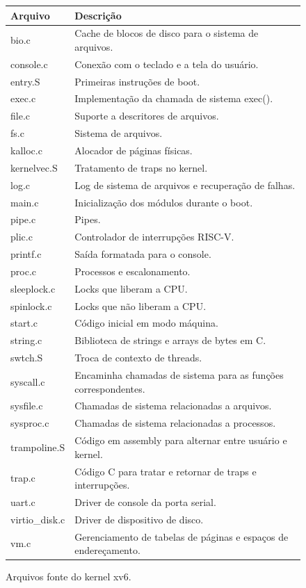 \begin{figure}[t]
\center
\begin{tabular}{l|l}
{\bf Arquivo} & {\bf Descrição} \\
\midrule
bio.c & Cache de blocos de disco para o sistema de arquivos. \\
console.c & Conexão com o teclado e a tela do usuário. \\
entry.S & Primeiras instruções de boot. \\
exec.c & Implementação da chamada de sistema exec(). \\
file.c & Suporte a descritores de arquivos. \\
fs.c & Sistema de arquivos. \\
kalloc.c & Alocador de páginas físicas. \\
kernelvec.S & Tratamento de traps no kernel. \\
log.c & Log de sistema de arquivos e recuperação de falhas. \\
main.c & Inicialização dos módulos durante o boot. \\
pipe.c & Pipes. \\
plic.c & Controlador de interrupções RISC-V. \\
printf.c & Saída formatada para o console. \\
proc.c & Processos e escalonamento. \\
sleeplock.c & Locks que liberam a CPU. \\
spinlock.c & Locks que não liberam a CPU. \\
start.c & Código inicial em modo máquina. \\
string.c & Biblioteca de strings e arrays de bytes em C. \\
swtch.S & Troca de contexto de threads. \\
syscall.c & Encaminha chamadas de sistema para as funções correspondentes. \\
sysfile.c & Chamadas de sistema relacionadas a arquivos. \\
sysproc.c & Chamadas de sistema relacionadas a processos. \\
trampoline.S & Código em assembly para alternar entre usuário e kernel. \\
trap.c & Código C para tratar e retornar de traps e interrupções. \\
uart.c & Driver de console da porta serial. \\
virtio\_disk.c & Driver de dispositivo de disco. \\
vm.c & Gerenciamento de tabelas de páginas e espaços de endereçamento. \\
\end{tabular}
\caption{Arquivos fonte do kernel xv6.}
\label{fig:source}
\end{figure}

